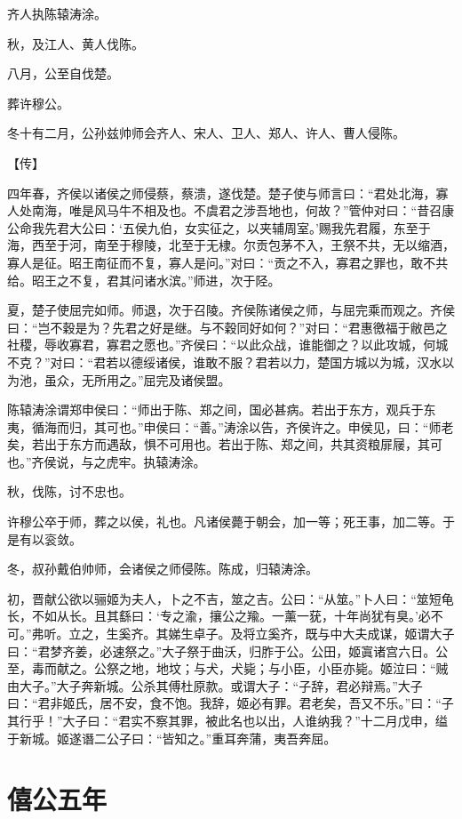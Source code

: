 \documentclass[a4paper,12pt,UTF8,twoside]{ctexbook}
\begin{document}
齐人执陈辕涛涂。

秋，及江人、黄人伐陈。

八月，公至自伐楚。

葬许穆公。

冬十有二月，公孙兹帅师会齐人、宋人、卫人、郑人、许人、曹人侵陈。

【传】

四年春，齐侯以诸侯之师侵蔡，蔡溃，遂伐楚。楚子使与师言曰：“君处北海，寡人处南海，唯是风马牛不相及也。不虞君之涉吾地也，何故？”管仲对曰：“昔召康公命我先君大公曰：‘五侯九伯，女实征之，以夹辅周室。’赐我先君履，东至于海，西至于河，南至于穆陵，北至于无棣。尔贡包茅不入，王祭不共，无以缩酒，寡人是征。昭王南征而不复，寡人是问。”对曰：“贡之不入，寡君之罪也，敢不共给。昭王之不复，君其问诸水滨。”师进，次于陉。

夏，楚子使屈完如师。师退，次于召陵。齐侯陈诸侯之师，与屈完乘而观之。齐侯曰：“岂不穀是为？先君之好是继。与不穀同好如何？”对曰：“君惠徼福于敝邑之社稷，辱收寡君，寡君之愿也。”齐侯曰：“以此众战，谁能御之？以此攻城，何城不克？”对曰：“君若以德绥诸侯，谁敢不服？君若以力，楚国方城以为城，汉水以为池，虽众，无所用之。”屈完及诸侯盟。

陈辕涛涂谓郑申侯曰：“师出于陈、郑之间，国必甚病。若出于东方，观兵于东夷，循海而归，其可也。”申侯曰：“善。”涛涂以告，齐侯许之。申侯见，曰：“师老矣，若出于东方而遇敌，惧不可用也。若出于陈、郑之间，共其资粮屝屦，其可也。”齐侯说，与之虎牢。执辕涛涂。

秋，伐陈，讨不忠也。

许穆公卒于师，葬之以侯，礼也。凡诸侯薨于朝会，加一等；死王事，加二等。于是有以衮敛。

冬，叔孙戴伯帅师，会诸侯之师侵陈。陈成，归辕涛涂。

初，晋献公欲以骊姬为夫人，卜之不吉，筮之吉。公曰：“从筮。”卜人曰：“筮短龟长，不如从长。且其繇曰：‘专之渝，攘公之羭。一薰一莸，十年尚犹有臭。’必不可。”弗听。立之，生奚齐。其娣生卓子。及将立奚齐，既与中大夫成谋，姬谓大子曰：“君梦齐姜，必速祭之。”大子祭于曲沃，归胙于公。公田，姬寘诸宫六日。公至，毒而献之。公祭之地，地坟；与犬，犬毙；与小臣，小臣亦毙。姬泣曰：“贼由大子。”大子奔新城。公杀其傅杜原款。或谓大子：“子辞，君必辩焉。”大子曰：“君非姬氏，居不安，食不饱。我辞，姬必有罪。君老矣，吾又不乐。”曰：“子其行乎！”大子曰：“君实不察其罪，被此名也以出，人谁纳我？”十二月戊申，缢于新城。姬遂谮二公子曰：“皆知之。”重耳奔蒲，夷吾奔屈。


\section{僖公五年}
\end{document}
